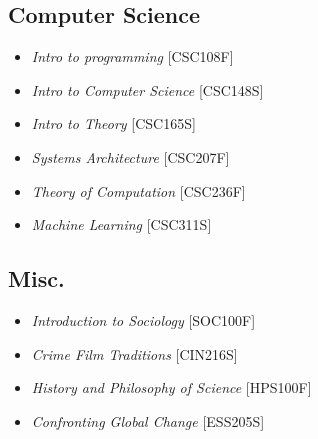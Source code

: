 \documentclass[%
               doublesided,
               paper=a4,
               fontsize=10pt
              ]{my-resume}
\begin{document}
{        \subsection{Computer Science}
            \begin{itemize}
                \item \textit{Intro to programming} [CSC108F]
                \item \textit{Intro to Computer Science} [CSC148S]
                \item \textit{Intro to Theory} [CSC165S]
                \item \textit{Systems Architecture} [CSC207F]
                \item \textit{Theory of Computation} [CSC236F]
                \item \textit{Machine Learning} [CSC311S]
            \end{itemize}
        
        \subsection{Misc.}
            \begin{itemize}
                \item \textit{Introduction to Sociology} [SOC100F]
                \item \textit{Crime Film Traditions} [CIN216S]
                \item \textit{History and Philosophy of Science} [HPS100F]
                \item \textit{Confronting Global Change} [ESS205S]
            \end{itemize}

            
}
\end{document}
